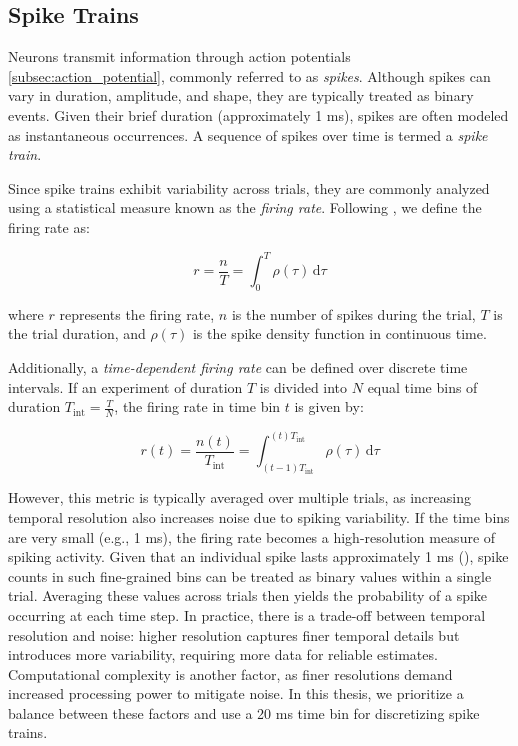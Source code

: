 \subsection{Spike Trains}
\label{subsec:spike_trains}

Neurons transmit information through action potentials \ref{subsec:action_potential}, commonly referred to as \emph{spikes}. Although spikes can vary in duration, amplitude, and shape, they are typically treated as binary events. Given their brief duration (approximately 1 ms), spikes are often modeled as instantaneous occurrences. A sequence of spikes over time is termed a \emph{spike train}.

Since spike trains exhibit variability across trials, they are commonly analyzed using a statistical measure known as the \emph{firing rate}. Following \citet{dayan2005theoretical}, we define the firing rate as:

\begin{equation}
    r = \frac{n}{T} = \int_{0}^{T} \rho(\tau) \,\mathrm{d}\tau
\end{equation}
\label{eq:firing_rate}

where $r$ represents the firing rate, $n$ is the number of spikes during the trial, $T$ is the trial duration, and $\rho(\tau)$ is the spike density function in continuous time.

Additionally, a \emph{time-dependent firing rate} can be defined over discrete time intervals. If an experiment of duration $T$ is divided into $N$ equal time bins of duration $T_{\text{int}} = \frac{T}{N}$, the firing rate in time bin $t$ is given by:

\begin{equation}
    r(t) = \frac{n(t)}{T_{\text{int}}} 
    = \int_{(t-1)T_{\text{int}}}^{(t)T_{\text{int}}} \rho(\tau) \,\mathrm{d}\tau
\end{equation}
\label{eq:firing_rate_time}


However, this metric is typically averaged over multiple trials, as increasing temporal resolution also increases noise due to spiking variability. If the time bins are very small (e.g., 1 ms), the firing rate becomes a high-resolution measure of spiking activity. Given that an individual spike lasts approximately 1 ms (\citet{dayan2005theoretical}), spike counts in such fine-grained bins can be treated as binary values within a single trial. Averaging these values across trials then yields the probability of a spike occurring at each time step. In practice, there is a trade-off between temporal resolution and noise: higher resolution captures finer temporal details but introduces more variability, requiring more data for reliable estimates. Computational complexity is another factor, as finer resolutions demand increased processing power to mitigate noise. In this thesis, we prioritize a balance between these factors and use a 20 ms time bin for discretizing spike trains.

